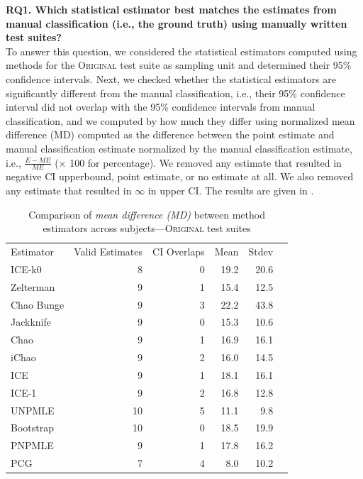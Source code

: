 \documentclass[sigconf,review,anonymous]{acmart}
\newcommand{\ICEallrare}{ICE-k0\xspace}
\newcommand{\Zelterman}{Zelterman\xspace}
\newcommand{\ChaoBunge}{Chao Bunge\xspace}
\newcommand{\Jackknife}{Jackknife\xspace}
\newcommand{\Chao}{Chao\xspace}
\newcommand{\improvedChao}{iChao\xspace}
\newcommand{\ICE}{ICE\xspace}
\newcommand{\improvedICE}{ICE-1\xspace}
\newcommand{\Unpmle}{UNPMLE\xspace}
\newcommand{\Bootstrap}{Bootstrap\xspace}
\newcommand{\Pnpmle}{PNPMLE\xspace}
\newcommand{\PCG}{PCG\xspace}
\newcommand{\original}{\textsc{Original}\xspace}
\begin{document}
\noindent\textbf{RQ1. Which statistical estimator best matches the
estimates from manual classification (i.e., the ground truth) using manually written test suites?}\\
%
To answer this question, we considered the statistical estimators computed
using methods for the \original test suite as sampling unit and determined
their 95\% confidence intervals.
%
Next, we checked whether the statistical estimators are significantly different
from the manual classification, i.e.,  their 95\% confidence interval did not overlap
with the 95\% confidence intervals from manual classification, and we computed
by how much they differ using normalized mean difference (MD) computed as the
difference between the point estimate and manual classification estimate
normalized by the manual classification estimate, i.e., $\frac{E - ME}{ME}$ ($\times$
100 for percentage). We removed any estimate that resulted in negative
CI upperbound, point estimate, or no estimate at all. We also removed any
estimate that resulted in $\infty$ in upper CI. The results are given in
.

\begin{table}
\caption{Comparison of \emph{mean difference (MD)} between method estimators
across subjects---\original test suites}
\begin{tabular}{|l|r|r|r|r|r|}

Estimator	&Valid Estimates	&CI Overlaps	&Mean	&Stdev	\\
\ICEallrare		&	8	&	0	&19.2	&	20.6\\
\Zelterman		&	9	&	1	&15.4	&	12.5\\
\ChaoBunge		&	9	&	3	&22.2	&	43.8\\
\Jackknife		&	9	&	0	&15.3	&	10.6\\
\Chao	        	&	9	&	1	&16.9	&	16.1\\
\improvedChao		&	9	&	2	&16.0	&	14.5\\
\ICE			&	9	&	1	&18.1	&	16.1\\
\improvedICE		&	9	&	2	&16.8	&	12.8\\
\Unpmle			&	10	&	5	&11.1	&	9.8\\
\Bootstrap		&	10	&	0	&18.5	&	19.9\\
\Pnpmle			&	9	&	1	&17.8	&	16.2\\
\PCG			&	7	&	4	&8.0	&	10.2\\
\end{tabular}
\label{tbl:estoriginal}
\end{table}
\end{document}
